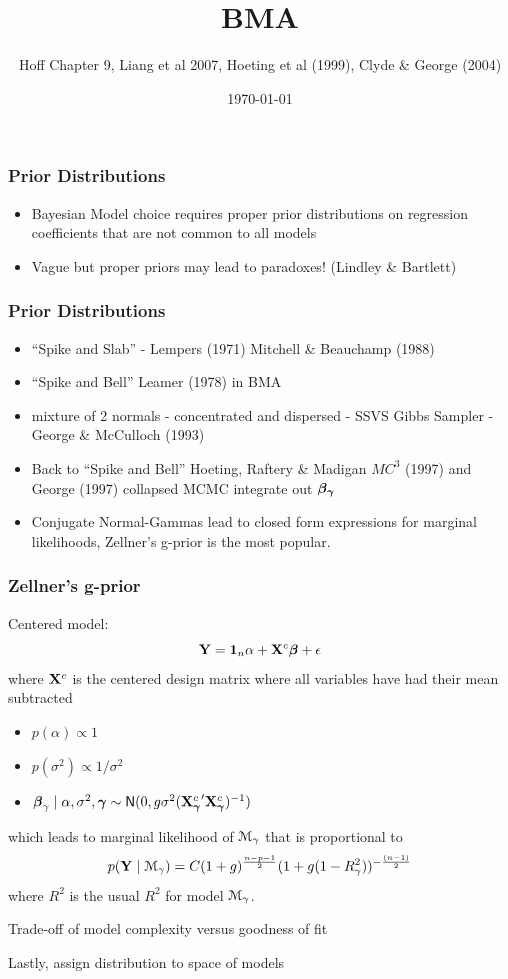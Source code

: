 \documentclass[]{beamer}
\title{BMA}
\author{Hoff Chapter 9, Liang et al 2007, Hoeting et al (1999), Clyde \&
 George (2004)}
\date{\today}
\begin{document}
\maketitle

\begin{frame}\frametitle{Prior Distributions}
  \begin{itemize}

  \item Bayesian Model choice requires  proper prior distributions on
  regression coefficients that are not common to all models\pause 
\vspace{2in}

\item Vague but proper priors  may lead to paradoxes!  (Lindley \& Bartlett) \pause 

  \end{itemize}
\end{frame}

\begin{frame}\frametitle{Prior Distributions}
  \begin{itemize}
  \item ``Spike and Slab'' - Lempers (1971) Mitchell \& Beauchamp (1988) \pause 
  \item ``Spike and Bell''  Leamer (1978)  in BMA \pause
  \item   mixture of 2 normals - concentrated and dispersed - SSVS Gibbs Sampler -  George \& McCulloch (1993) \pause
\item Back to ``Spike and Bell''  Hoeting, Raftery \& Madigan $MC^3$ (1997) and George  (1997) collapsed MCMC integrate out $\boldsymbol{\beta_\gamma}$
  \item Conjugate Normal-Gammas lead to closed form expressions for
  marginal likelihoods, Zellner's g-prior is the most popular. \pause 
  \end{itemize}
\end{frame}

\begin{frame}\frametitle{Zellner's g-prior}
  Centered model:  $$\mathbf{Y} = \mathbf{1}_n \alpha + \mathbf{X}^c \boldsymbol{\beta} + \epsilon$$  
  where $\mathbf{X}^c$ is the centered design matrix where all variables have
  had their mean subtracted \pause 
\begin{itemize}
\item   $p(\alpha) \propto 1$ \pause 
\item  $p(\sigma^2) \propto 1/\sigma^2$  \pause 
\item  $\boldsymbol{\beta}_\gamma \mid \alpha, \sigma^2, \boldsymbol{\gamma} \sim \textsf{N}(0, g \sigma^2
  ({\mathbf{X}_{\boldsymbol{\gamma}}^c}^\prime \mathbf{X}_{\boldsymbol{\gamma}}^c)^{-1})$ \pause 
\end{itemize}
which leads to marginal likelihood of ${\cal M}_\gamma$ that is proportional
to $$ p(\mathbf{Y} \mid {\cal M}_\gamma) = C (1 + g)^{\frac{n-p-1}{2}} ( 1 + g (1 -
 R^2_\gamma))^{- \frac{(n-1)}{2}}$$
where $R^2$ is the usual $R^2$ for model ${\cal M}_\gamma$.
\pause 

Trade-off of model complexity versus goodness of fit

\bigskip
Lastly, assign distribution to space of models
\end{frame}
\end{document}

